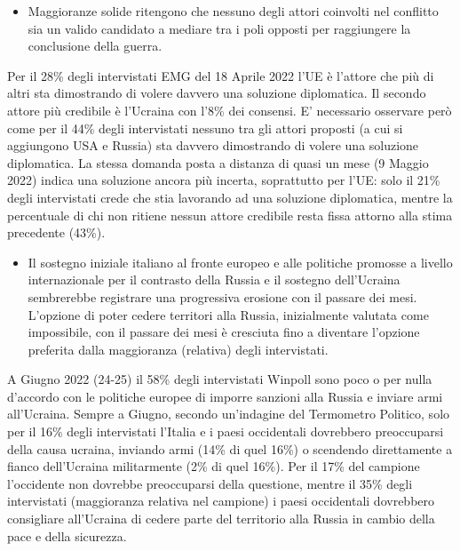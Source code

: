 \documentclass[
  openany]{book}
\providecommand{\tightlist}{%
  \setlength{\itemsep}{0pt}\setlength{\parskip}{0pt}}
\begin{document}
\begin{itemize}
\tightlist
\item
  Maggioranze solide ritengono che nessuno degli attori coinvolti nel conflitto sia un valido candidato a mediare tra i poli opposti per raggiungere la conclusione della guerra.
\end{itemize}

Per il 28\% degli intervistati EMG del 18 Aprile 2022 l'UE è l'attore che più di altri sta dimostrando di volere davvero una soluzione diplomatica. Il secondo attore più credibile è l'Ucraina con l'8\% dei consensi. E' necessario osservare però come per il 44\% degli intervistati nessuno tra gli attori proposti (a cui si aggiungono USA e Russia) sta davvero dimostrando di volere una soluzione diplomatica. La stessa domanda posta a distanza di quasi un mese (9 Maggio 2022) indica una soluzione ancora più incerta, soprattutto per l'UE: solo il 21\% degli intervistati crede che stia lavorando ad una soluzione diplomatica, mentre la percentuale di chi non ritiene nessun attore credibile resta fissa attorno alla stima precedente (43\%).

\begin{itemize}
\tightlist
\item
  Il sostegno iniziale italiano al fronte europeo e alle politiche promosse a livello internazionale per il contrasto della Russia e il sostegno dell'Ucraina sembrerebbe registrare una progressiva erosione con il passare dei mesi. L'opzione di poter cedere territori alla Russia, inizialmente valutata come impossibile, con il passare dei mesi è cresciuta fino a diventare l'opzione preferita dalla maggioranza (relativa) degli intervistati.
\end{itemize}

A Giugno 2022 (24-25) il 58\% degli intervistati Winpoll sono poco o per nulla d'accordo con le politiche europee di imporre sanzioni alla Russia e inviare armi all'Ucraina. Sempre a Giugno, secondo un'indagine del Termometro Politico, solo per il 16\% degli intervistati l'Italia e i paesi occidentali dovrebbero preoccuparsi della causa ucraina, inviando armi (14\% di quel 16\%) o scendendo direttamente a fianco dell'Ucraina militarmente (2\% di quel 16\%). Per il 17\% del campione l'occidente non dovrebbe preoccuparsi della questione, mentre il 35\% degli intervistati (maggioranza relativa nel campione) i paesi occidentali dovrebbero consigliare all'Ucraina di cedere parte del territorio alla Russia in cambio della pace e della sicurezza.
\end{document}
